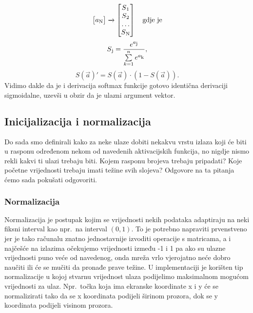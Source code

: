 \documentclass[times, utf8, zavrsni]{fer}
\begin{document}
\begin{enumerate}
\[\begin{bmatrix}
            a\textsubscript{N}
        \end{bmatrix}
        \xrightarrow{}
        \begin{bmatrix}
            S\textsubscript{1} \\
            S\textsubscript{2} \\
            \dots \\
            S\textsubscript{N}
        \end{bmatrix} \quad \text{gdje je}
    \]
    \begin{equation}
        \label{eq:soft}
        S\textsubscript{j} = \frac{e^{a\textsubscript{j}}}{\sum\limits_{k=1}^ne^{a\textsubscript{k}}},
    \end{equation}
    \begin{equation}
        \label{eq:soft-der}
        S(\vec{a})' = S(\vec{a}) \cdot (1 - S(\vec{a})).
    \end{equation}
    Vidimo dakle da je i derivacija softmax funkcije gotovo identična derivaciji sigmoidalne, uzevši u obzir da je ulazni argument vektor.
\end{enumerate}

\subsection{Inicijalizacija i normalizacija}
Do sada smo definirali kako za neke ulaze dobiti nekakvu vrstu izlaza koji će biti u rasponu određenom nekom od navedenih aktivacijskih funkcija, no nigdje nismo rekli kakvi ti ulazi trebaju biti. Kojem rasponu brojeva trebaju pripadati? Koje početne vrijednosti trebaju imati težine svih slojeva? Odgovore na ta pitanja ćemo sada pokušati odgovoriti.

\subsubsection{Normalizacija}
Normalizacija  je postupak kojim se vrijednosti nekih podataka adaptiraju na neki fiksni interval kao npr.\ na interval $(0, 1)$. To je potrebno napraviti prvenstveno jer je tako računalu znatno jednostavnije izvoditi operacije s matricama, a i najčešće na izlazima očekujemo vrijednosti između -1 i 1 pa ako su ulazne vrijednosti puno veće od navedenog, onda mreža vrlo vjerojatno neće dobro naučiti ili će se mučiti da pronađe prave težine. U implementaciji je korišten tip normalizacije u kojoj stvarnu vrijednost ulaza podijelimo maksimalnom mogućom vrijednosti za ulaz. Npr.\ točka koja ima ekranske koordinate x i y će se normalizirati tako da se x koordinata podijeli širinom prozora, dok se y koordinata podijeli visinom prozora.
\end{document}
